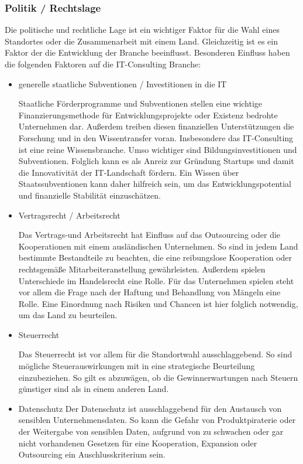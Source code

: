  \subsubsection{Politik / Rechtslage}
Die politische und rechtliche Lage ist ein wichtiger Faktor für die Wahl eines Standortes oder die Zusammenarbeit mit einem Land. Gleichzeitig ist es ein Faktor der die Entwicklung der Branche beeinflusst.
Besonderen Einfluss haben die folgenden Faktoren auf die IT-Consulting Branche:
\begin{itemize} 
\item {generelle staatliche Subventionen / Investitionen in die IT}

 Staatliche Förderprogramme und Subventionen stellen eine wichtige Finanzierungsmethode für Entwicklungsprojekte oder Existenz bedrohte Unternehmen dar. 
 Außerdem treiben diesen finanziellen Unterstützungen die Forschung und in den Wissentransfer voran. Insbesondere das IT-Consulting ist eine reine Wissensbranche. 
 Umso wichtiger sind Bildungsinvestitionen und Subventionen. Folglich kann es als Anreiz zur Gründung Startups und damit die Innovativität der IT-Landschaft fördern. 
Ein Wissen über Staatssubventionen kann daher hilfreich sein, um das Entwicklungspotential und finanzielle Stabilität einzuschätzen.

\item  {Vertragsrecht / Arbeitsrecht}

 Das Vertrags-und Arbeitsrecht hat Einfluss auf das Outsourcing oder die Kooperationen mit einem ausländischen Unternehmen. 
 So sind in jedem Land bestimmte Bestandteile zu beachten, die eine reibungslose Kooperation oder rechtsgemäße Mitarbeiteranstellung gewährleisten. Außerdem spielen Unterschiede im Handelsrecht eine Rolle. 
Für das Unternehmen spielen steht vor allem die Frage nach der Haftung und Behandlung von Mängeln eine Rolle. 
Eine Einordnung nach Risiken und Chancen ist hier folglich notwendig, um das Land zu beurteilen. 

\item {Steuerrecht}

 Das Steuerrecht ist vor allem für die Standortwahl ausschlaggebend. 
 So sind mögliche Steuerauswirkungen mit in eine strategische Beurteilung  einzubeziehen. So gilt es abzuwägen, ob die Gewinnerwartungen nach Steuern günstiger sind als in einem anderen Land.
 
\item {Datenschutz}
  Der Datenschutz ist ausschlaggebend für den Austausch von sensiblen Unternehmensdaten. 
  So kann die Gefahr von Produktpiraterie oder der Weitergabe von sensiblen Daten, aufgrund von zu schwachen oder gar nicht vorhandenen Gesetzen für eine Kooperation, Expansion oder Outsourcing ein Auschlusskriterium sein.
  
  \end{itemize}
